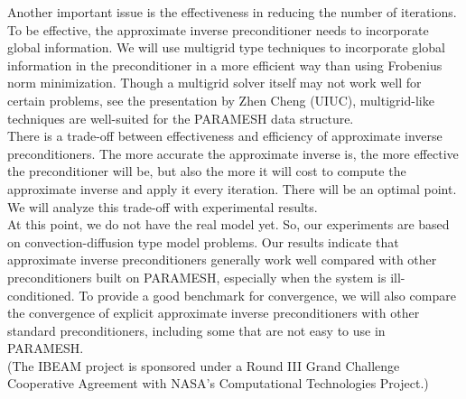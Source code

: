 \documentclass{report}
\begin{document}
Another important issue is the effectiveness in reducing the number of
iterations. To be effective, the approximate inverse preconditioner needs
to incorporate global information. We will use multigrid type techniques
to incorporate global information in the preconditioner in a more
efficient way than using Frobenius norm minimization. Though a multigrid
solver itself may not work well for certain problems, see the
presentation by Zhen Cheng (UIUC), multigrid-like techniques are
well-suited for the PARAMESH data structure.\\

There is a trade-off between effectiveness and efficiency of
approximate inverse preconditioners. The more accurate the
approximate inverse is, the more effective the preconditioner will be,
but also the more it will cost to compute the approximate inverse and
apply it every iteration. There will be an optimal point. We will analyze
this trade-off with experimental results.\\

At this point, we do not have the real model yet. So, our
experiments are based on convection-diffusion type model problems. Our
results indicate that approximate inverse preconditioners generally work
well compared with other preconditioners built on
PARAMESH, especially when the system is ill-conditioned. To
provide a good benchmark for convergence, we will also compare the
convergence of explicit approximate inverse preconditioners with other
standard preconditioners, including some that are not easy to use in
PARAMESH.\\

(The IBEAM project is sponsored under a Round III Grand Challenge
Cooperative Agreement with NASA's Computational Technologies Project.)\\
\end{document}
